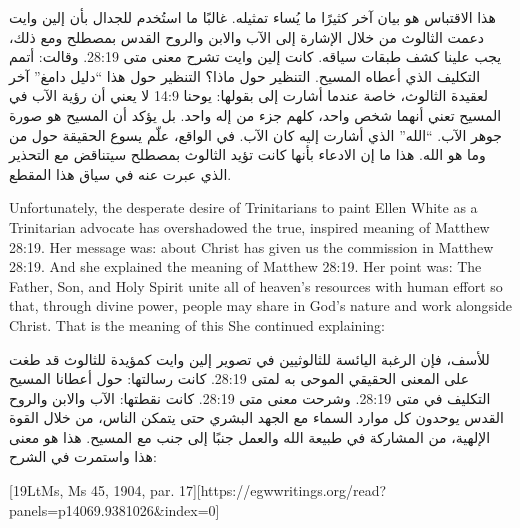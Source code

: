 هذا الاقتباس هو بيان آخر كثيرًا ما يُساء تمثيله. غالبًا ما استُخدم للجدال بأن إلين وايت دعمت الثالوث من خلال الإشارة إلى الآب والابن والروح القدس بمصطلح  ومع ذلك، يجب علينا كشف طبقات سياقه. كانت إلين وايت تشرح معنى متى 28:19. وقالت:  أتمم التكليف الذي أعطاه المسيح. التنظير حول ماذا؟ التنظير حول  هذا “دليل دامغ” آخر لعقيدة الثالوث، خاصة عندما أشارت إلى  بقولها:  يوحنا 14:9 لا يعني أن رؤية الآب في المسيح تعني أنهما شخص واحد، كلهم جزء من إله واحد. بل يؤكد أن المسيح هو صورة جوهر الآب. “الله” الذي أشارت إليه كان الآب. في الواقع، علّم يسوع الحقيقة حول من وما هو الله. هذا ما   إن الادعاء بأنها كانت تؤيد الثالوث بمصطلح  سيتناقض مع التحذير الذي عبرت عنه في سياق هذا المقطع.


Unfortunately, the desperate desire of Trinitarians to paint Ellen White as a Trinitarian advocate has overshadowed the true, inspired meaning of Matthew 28:19. Her message was:  about  Christ has given us the commission in Matthew 28:19. And she explained the meaning of Matthew 28:19. Her point was: The Father, Son, and Holy Spirit unite all of heaven’s resources with human effort so that, through divine power, people may share in God’s nature and work alongside Christ. That is the meaning of this  She continued explaining:


للأسف، فإن الرغبة اليائسة للثالوثيين في تصوير إلين وايت كمؤيدة للثالوث قد طغت على المعنى الحقيقي الموحى به لمتى 28:19. كانت رسالتها:  حول  أعطانا المسيح التكليف في متى 28:19. وشرحت معنى متى 28:19. كانت نقطتها: الآب والابن والروح القدس يوحدون كل موارد السماء مع الجهد البشري حتى يتمكن الناس، من خلال القوة الإلهية، من المشاركة في طبيعة الله والعمل جنبًا إلى جنب مع المسيح. هذا هو معنى هذا  واستمرت في الشرح:


[19LtMs, Ms 45, 1904, par. 17][https://egwwritings.org/read?panels=p14069.9381026&index=0]


